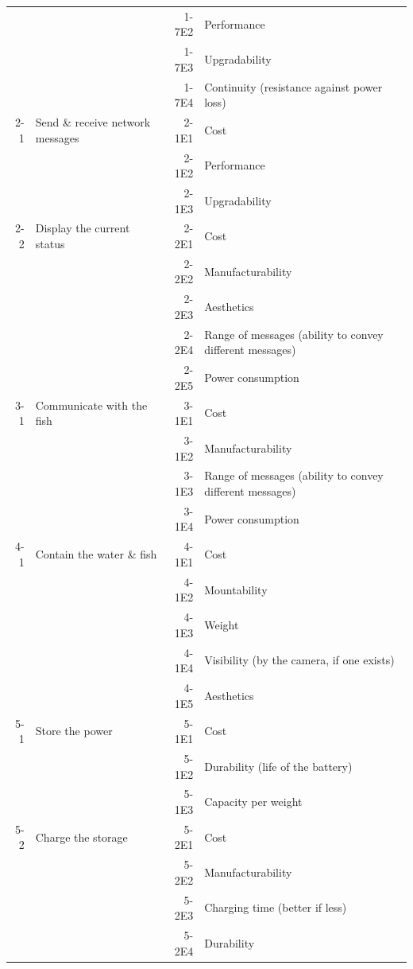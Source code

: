 \documentclass[a4paper, 10pt, DIV=16, parskip = full, twocolumn = false]{scrartcl}
\begin{document}
\begin{table}
\begin{tabular}{rlrl}
		& & 1-7E2 & Performance \\	
		& & 1-7E3 & Upgradability \\
		& & 1-7E4 & Continuity (resistance against power loss) \\	
		2-1 & Send \& receive network messages & 2-1E1 & Cost \\
		& & 2-1E2 & Performance \\	
		& & 2-1E3 & Upgradability \\
		2-2 & Display the current status & 2-2E1 & Cost\\
		& & 2-2E2 & Manufacturability \\	
		& & 2-2E3 & Aesthetics \\	
		& & 2-2E4 & Range of messages (ability to convey different messages) \\	
		& & 2-2E5 & Power consumption \\	
		3-1 & Communicate with the fish & 3-1E1 & Cost \\
		& & 3-1E2 & Manufacturability \\		
		& & 3-1E3 & Range of messages (ability to convey different messages) \\	
		& & 3-1E4 & Power consumption \\	
		4-1 & Contain the water \& fish & 4-1E1 & Cost \\
		& & 4-1E2 & Mountability \\	
		& & 4-1E3 & Weight \\
		& & 4-1E4 & Visibility (by the camera, if one exists) \\
		& & 4-1E5 & Aesthetics \\
		5-1 & Store the power & 5-1E1 & Cost \\
		& & 5-1E2 & Durability (life of the battery) \\	
		& & 5-1E3 & Capacity per weight \\
		5-2 & Charge the storage & 5-2E1 & Cost \\
		& & 5-2E2 & Manufacturability \\	
		& & 5-2E3 & Charging time (better if less)\\
		& & 5-2E4 & Durability \\
		\bottomrule
	\end{tabular}
\label{table:criterion}
\end{table}

\end{document}
